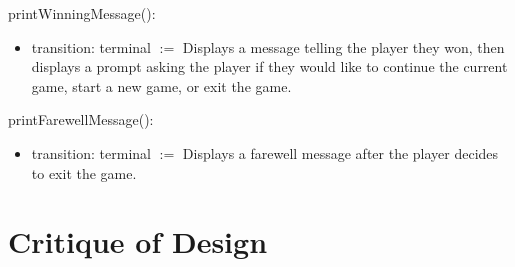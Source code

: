 \documentclass[12pt]{article}
\begin{document}
\noindent printWinningMessage():
\begin{itemize}
\item transition: terminal $:=$ Displays a message telling the player they won, then displays a prompt asking the player if they would like to continue the current game, start a new game, or exit the game.
\end{itemize}

\noindent printFarewellMessage():
\begin{itemize}
\item transition: terminal $:=$ Displays a farewell message after the player decides to exit the game.
\end{itemize}

\newpage

\section*{Critique of Design}
\end{document}
